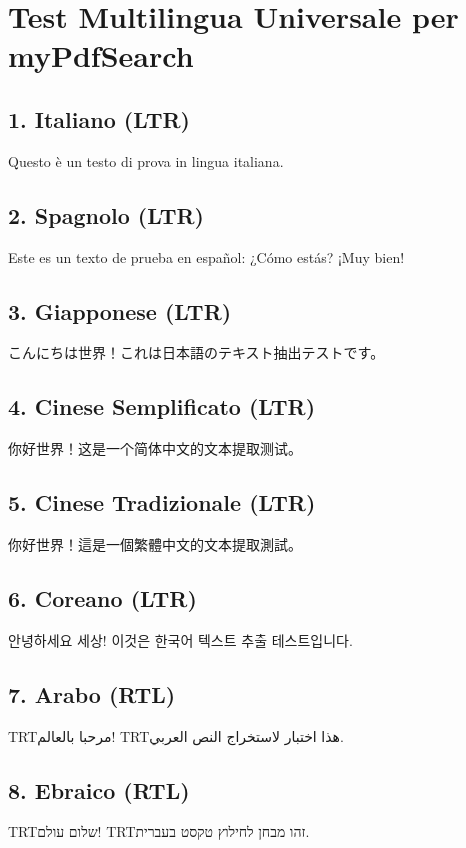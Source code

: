 \documentclass[12pt,a4paper]{article}
\newcommand{\textarabicrtl}[1]{{\textdir TRT\arabicfont #1}}
\newcommand{\texthebrewrtl}[1]{{\textdir TRT\hebrewfont #1}}
\begin{document}
\section*{Test Multilingua Universale per myPdfSearch}

\subsection*{1. Italiano (LTR)}
Questo è un testo di prova in lingua italiana.

\subsection*{2. Spagnolo (LTR)}
Este es un texto de prueba en español: ¿Cómo estás? ¡Muy bien!

\subsection*{3. Giapponese (LTR)}
{\japanesefont こんにちは世界！これは日本語のテキスト抽出テストです。}

\subsection*{4. Cinese Semplificato (LTR)}
{\chinesesimplifiedfont 你好世界！这是一个简体中文的文本提取测试。}

\subsection*{5. Cinese Tradizionale (LTR)}
{\chinesetraditionalfont 你好世界！這是一個繁體中文的文本提取測試。}

\subsection*{6. Coreano (LTR)}
{\koreanfont 안녕하세요 세상! 이것은 한국어 텍스트 추출 테스트입니다.}

\subsection*{7. Arabo (RTL)}
\textarabicrtl{مرحبا بالعالم}! \textarabicrtl{هذا اختبار لاستخراج النص العربي}.

\subsection*{8. Ebraico (RTL)}
\texthebrewrtl{שלום עולם}! \texthebrewrtl{זהו מבחן לחילוץ טקסט בעברית}.
\end{document}
